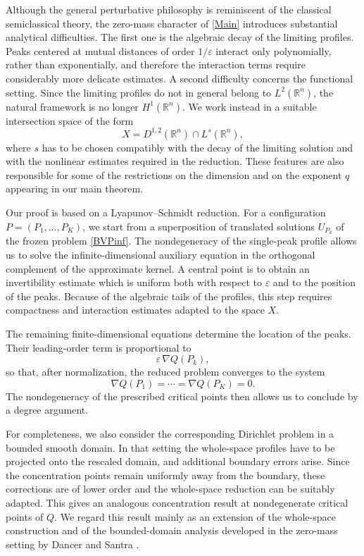 \documentclass[12pt]{amsart}
\theoremstyle{plain}
\theoremstyle{definition}
\theoremstyle{remark}
\renewcommand{\epsilon}{\varepsilon}
\begin{document}
Although the general perturbative philosophy is reminiscent of the
classical semiclassical theory, the zero-mass character of
\eqref{Main} introduces substantial analytical difficulties. The first
one is the algebraic decay of the limiting profiles. Peaks centered at
mutual distances of order \(1/\epsilon\) interact only polynomially,
rather than exponentially, and therefore the interaction terms require
considerably more delicate estimates. A second difficulty concerns the
functional setting. Since the limiting profiles do not in general belong
to \(L^2(\mathbb{R}^n)\), the natural framework is no longer
\(H^1(\mathbb{R}^n)\). We work instead in a suitable intersection space
of the form
\[
 X=D^{1,2}(\mathbb{R}^n)\cap L^s(\mathbb{R}^n),
\]
where \(s\) has to be chosen compatibly with the decay of the limiting
solution and with the nonlinear estimates required in the reduction.
These features are also responsible for some of the restrictions on the
dimension and on the exponent \(q\) appearing in our main theorem.

Our proof is based on a Lyapunov--Schmidt reduction. For a configuration
\(P=(P_1,\ldots,P_K)\), we start from a superposition of translated
solutions \(U_{P_k}\) of the frozen problem \eqref{BVPinf}. The
nondegeneracy of the single-peak profile allows us to solve the
infinite-dimensional auxiliary equation in the orthogonal complement of
the approximate kernel. A central point is to obtain an invertibility
estimate which is uniform both with respect to \(\epsilon\) and to the
position of the peaks. Because of the algebraic tails of the profiles,
this step requires compactness and interaction estimates adapted to the
space \(X\).

The remaining finite-dimensional equations determine the location of the
peaks. Their leading-order term is proportional to
\[
 \epsilon\,\nabla Q(P_k),
\]
so that, after normalization, the reduced problem converges to the system
\[
 \nabla Q(P_1)=\cdots=\nabla Q(P_K)=0.
\]
The nondegeneracy of the prescribed critical points then allows us to
conclude by a degree argument.

For completeness, we also consider the corresponding Dirichlet problem in
a bounded smooth domain. In that setting the whole-space profiles have to
be projected onto the rescaled domain, and additional boundary errors
arise. Since the concentration points remain uniformly away from the
boundary, these corrections are of lower order and the whole-space
reduction can be suitably adapted. This gives an analogous concentration
result at nondegenerate critical points of \(Q\). We regard this result
mainly as an extension of the whole-space construction and of the
bounded-domain analysis developed in the zero-mass setting by Dancer and
Santra \cite{DancerSantra2010}.
\end{document}
